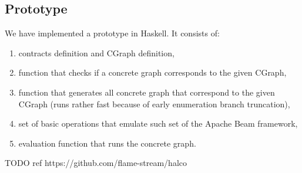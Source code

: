 \subsection{Prototype}

We have implemented a prototype in Haskell.
It consists of:
\begin{enumerate}
    \item contracts definition and CGraph definition,
    \item function that checks if a concrete graph corresponds to the given CGraph,
    \item function that generates all concrete graph that correspond to the given CGraph (runs rather fast because of early enumeration branch truncation),
    \item set of basic operations that emulate such set of the Apache Beam framework,
    \item evaluation function that runs the concrete graph.
\end{enumerate}

TODO ref https://github.com/flame-stream/halco
